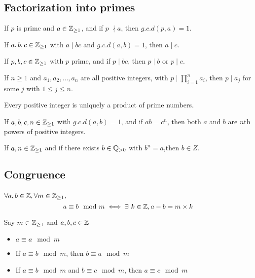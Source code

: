 \documentclass[a4paper]{article}
\begin{document}
\subsection{Factorization into primes}
\begin{lemma}
If $p$ is prime and $a \in \mathbb{Z}_{\geq 1}$, and if $p 􏰙\nmid a$, then $g.c.d(p, a) = 1$.
\end{lemma}
\begin{lemma}
If $a,b,c \in \mathbb{Z}_{\geq 1}$ with $a \mid bc$ and $g.c.d(a,b) = 1$, then $a \mid c$.
\end{lemma}
\begin{thm}
If $p, b, c \in \mathbb{Z}_{\geq 1}$ with $p$ prime, and if $p \mid bc$, then $p \mid b$ or $p \mid c$.
\end{thm}
\begin{thm}
If $n \geq 1$ and $a_1, a_2, ..., a_n$ are all positive integers, with $p \mid \prod^n_{i=1}a_i$, then $p \mid a_j$ for some $j$ with $1 \leq j \leq n$.
\end{thm}
\begin{thm}
Every positive integer is uniquely a product of prime numbers.
\end{thm}
\begin{thm}
If $a, b, c, n \in \mathbb{Z}_{\geq 1}$ with $g.c.d(a, b) = 1$, and if $ab = c^n$, then both $a$ and $b$ are $n$th powers of positive integers.
\end{thm}
\begin{thm}
If $a, n \in \mathbb{Z}_{\geq 1}$ and if there exists $b \in \mathbb{Q}_{>0}$ with $b^n =a$,then $b \in Z$.
\end{thm}

\subsection{Congruence}
\begin{defi}
$\forall a,b \in \mathbb{Z}, \forall m \in \mathbb{Z}_{\geq 1}$,
$$a \equiv b \mod m \iff \exists\ k \in \Z, a - b = m \times k$$
\end{defi}

\begin{thm}
Say $m \in \mathbb{Z}_{\geq 1}$ and $a, b, c \in \mathbb{Z}$
\begin{itemize}
	\item $a \equiv a \mod m$
	\item If $a \equiv b \mod m$, then $b \equiv a \mod m$
	\item If $a \equiv b \mod m$ and $b \equiv c \mod m$, then $a \equiv c \mod m$
\end{itemize}
\end{thm}
\end{document}
